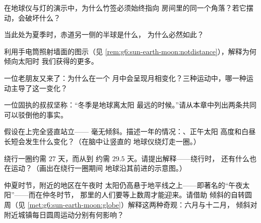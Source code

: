 \begin{exercise}[$\star$]\label{exo:g6:sun-earth-moon:5}
在地球仪与灯的演示中，为什么竹签必须始终指向
房间里的同一个角落？若它摆动，会破坏什么？
\end{exercise}

\begin{exercise}[$\star$]\label{exo:g6:sun-earth-moon:6}
当此处为夏季时，赤道另一侧的半球是什么，
为什么必然如此？
\end{exercise}

\begin{exercise}[$\star$]\label{exo:g6:sun-earth-moon:7}
利用手电筒照射墙面的图示（见
\cref{rem:g6:sun-earth-moon:notdistance}），解释为何倾向太阳时
我们获得的更多。
\end{exercise}

\begin{exercise}[$\star$]\label{exo:g6:sun-earth-moon:8}
一位老朋友又来了：为什么在一个
月中会呈现月相变化？三种运动中，哪一种运动主导了这一变化？
\end{exercise}

\begin{exercise}[$\star\star$]\label{exo:g6:sun-earth-moon:9}
一位固执的叔叔坚称：“冬季是地球离太阳
最远的时候。”请从本章中列出两条共同
可以驳倒他的事实。
\end{exercise}

\begin{exercise}[$\star\star$]\label{exo:g6:sun-earth-moon:10}
假设在上完全竖直站立——
毫无倾斜。描述一年的情况：、正午太阳
高度和白昼长短会发生什么变化？（在脑中让竖直的
地球仪绕灯走一圈。）
\end{exercise}

\begin{exercise}[$\star\star$]\label{exo:g6:sun-earth-moon:11}
绕行一圈约需 $27$ 天，而从到
约需 $29.5$ 天。请提出解释——绕行时，
还有什么也在运动？（画出在绕行一圈期间
地球沿其前进的示意图。）
\end{exercise}

\begin{exercise}[$\star\star\star$]\label{exo:g6:sun-earth-moon:12}
仲夏时节，附近的地区在午夜时
太阳仍高悬于地平线之上——即著名的“午夜太阳”——而在仲冬时节，
那里的人们要等上数周才能迎来。请借助
倾斜的自转圆周（见
\cref{met:g6:sun-earth-moon:globe}）解释这两种奇观：六月与十二月，
倾斜对附近城镇每日圆周运动分别有何影响？
\end{exercise}

